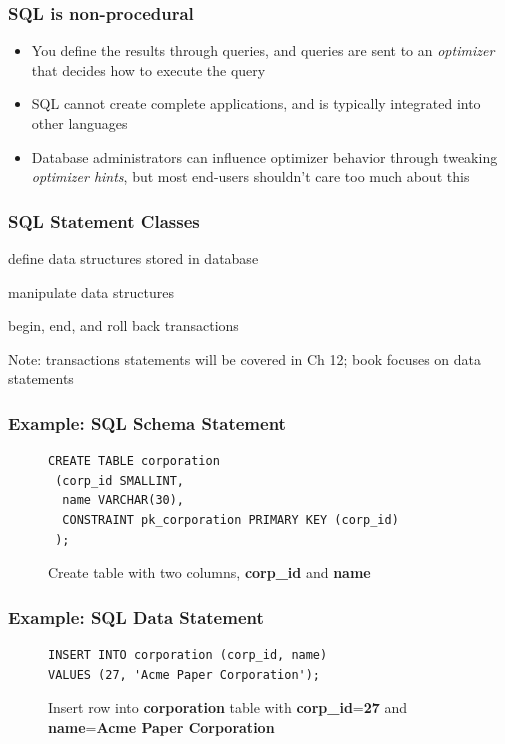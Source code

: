 \documentclass{beamer}
\begin{document}
\begin{frame}
\frametitle{SQL is non-procedural}
\begin{itemize}
	\item You define the results through queries, and queries are sent to an \textit{optimizer} that decides how to execute the query
	\item SQL cannot create complete applications, and is typically integrated into other languages
	\item Database administrators can influence optimizer behavior through tweaking \textit{optimizer hints}, but most end-users shouldn't care too much about this
	
\end{itemize}
\end{frame}

\begin{frame}
\frametitle{SQL Statement Classes}
\begin{description}[align=left]
	\item[schema statements] define data structures stored in database
	\item[\textbf{data statements}] manipulate data structures
	\item[transaction statements] begin, end, and roll back transactions
\end{description}

Note: transactions statements will be covered in Ch 12; book focuses on data statements
\end{frame}

\begin{frame}[fragile]
\frametitle{Example: SQL Schema Statement}
\begin{figure}
\begin{lstlisting}
CREATE TABLE corporation
 (corp_id SMALLINT,
  name VARCHAR(30),
  CONSTRAINT pk_corporation PRIMARY KEY (corp_id)
 );
\end{lstlisting}
\caption{Create table with two columns, \textbf{corp\_id} and \textbf{name}}
\end{figure}
\end{frame}

\begin{frame}[fragile]
\frametitle{Example: SQL Data Statement}
\begin{figure}
\begin{lstlisting}
INSERT INTO corporation (corp_id, name)
VALUES (27, 'Acme Paper Corporation');
\end{lstlisting}
\caption{Insert row into \textbf{corporation} table with \textbf{corp\_id}=\textbf{27} and \textbf{name}=\textbf{Acme Paper Corporation}}
\end{figure}
\end{frame}
\end{document}
